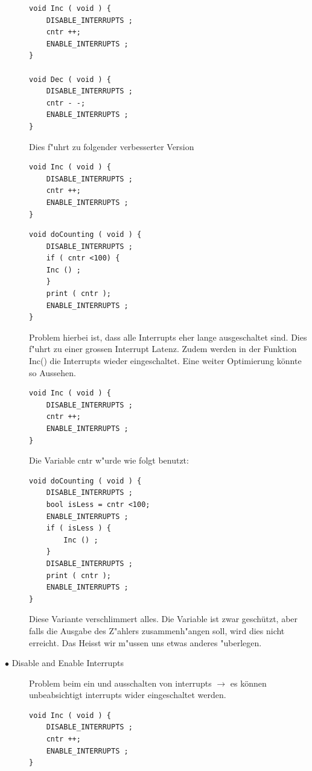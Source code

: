 \documentclass[a4paper, 8pt]{extarticle}
\begin{document}
\begin{multicols*}{3}
\begin{description}
\begin{lstlisting}
void Inc ( void ) {
	DISABLE_INTERRUPTS ;
	cntr ++;
	ENABLE_INTERRUPTS ;
}

void Dec ( void ) {
	DISABLE_INTERRUPTS ;
	cntr - -;
	ENABLE_INTERRUPTS ;
}
								\end{lstlisting}
								Dies f"uhrt zu folgender verbesserter Version
								\begin{lstlisting}
void Inc ( void ) {
	DISABLE_INTERRUPTS ;
	cntr ++;
	ENABLE_INTERRUPTS ;
}
								\end{lstlisting}
								\begin{lstlisting}
void doCounting ( void ) {
	DISABLE_INTERRUPTS ;
	if ( cntr <100) {
	Inc () ;
	}
	print ( cntr );
	ENABLE_INTERRUPTS ;
}
								\end{lstlisting}
								Problem hierbei ist, dass alle Interrupts eher lange ausgeschaltet sind. Dies f"uhrt zu einer grossen Interrupt Latenz.
								Zudem werden in der Funktion Inc() die Interrupts wieder eingeschaltet.
								Eine weiter Optimierung könnte so Aussehen.
								\begin{lstlisting}
void Inc ( void ) {
	DISABLE_INTERRUPTS ;
	cntr ++;
	ENABLE_INTERRUPTS ;
}
								\end{lstlisting}
								Die Variable cntr w"urde wie folgt benutzt:
								\begin{lstlisting}
void doCounting ( void ) {
	DISABLE_INTERRUPTS ;
	bool isLess = cntr <100;
	ENABLE_INTERRUPTS ;
	if ( isLess ) {
		Inc () ;
	}
	DISABLE_INTERRUPTS ;
	print ( cntr );
	ENABLE_INTERRUPTS ;
}
								\end{lstlisting}
								Diese Variante verschlimmert alles. Die Variable ist zwar geschützt, aber falls die Ausgabe des Z"ahlers zusammenh"angen soll, wird dies nicht erreicht.
								Das Heisst wir m"ussen uns etwas anderes "uberlegen.
							\item[$\bullet$ Disable and Enable Interrupts]
					Problem beim ein und ausschalten von interrupts $\rightarrow$ es können unbeabsichtigt interrupts wider eingeschaltet werden.
								\begin{lstlisting}
void Inc ( void ) {
	DISABLE_INTERRUPTS ;
	cntr ++;
	ENABLE_INTERRUPTS ;
}


\end{lstlisting}
\end{description}
\end{multicols*}
\end{document}
